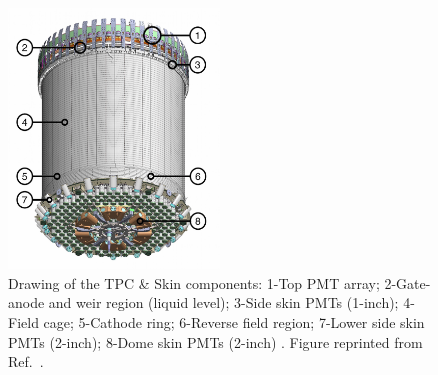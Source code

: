 \begin{figure}[!ht]
     \centering
     \includegraphics[width=0.5\textwidth]{figures/LZ/CAD_TPC.jpg}
     \caption[Drawing of the LZ TPC \& Skin components.]{Drawing of the TPC \& Skin components: 1-Top PMT array; 2-Gate-anode and weir region (liquid level); 3-Side skin PMTs (1-inch); 4-Field cage; 5-Cathode ring; 6-Reverse field region; 7-Lower side skin PMTs (2-inch); 8-Dome skin PMTs (2-inch) \cite{LZNIMA}. Figure reprinted from Ref.~\cite{LZNIMA}.}
     \label{fig:LZ/CAD_TPC}
\end{figure}


